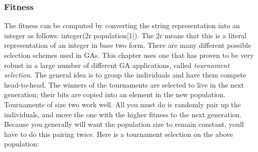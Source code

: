 
\subsubsection{Fitness}

The fitness can be computed by converting the string representation into
an integer as follows: \textsf{integer({\textquotedbl}2r{\textquotedbl}
{\textbar}{\textbar} population[1])}. The \textsf{2r} means that this
is a literal representation of an integer in base two form. There are
many different possible selection schemes used in GAs. This chapter
uses one that has proven to be very robust in a large number of
different GA applications, called \textit{tournament selection}. The
general idea is to group the individuals and have them compete
head-to-head. The winners of the tournaments are selected to live in
the next generation; their bits are copied into an element in the new
population. Tournaments of size two work well. All you must do is
randomly pair up the individuals, and move the one with the higher
fitness to the next generation. Because you generally will want the
population size to remain constant, you{\textquotesingle}ll have to do
this pairing twice. Here is a tournament selection on the above
population:


